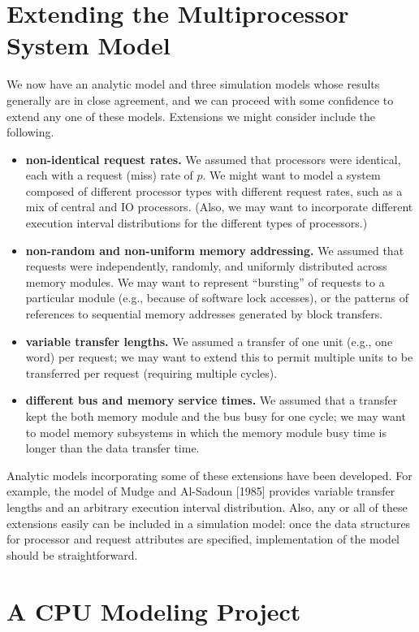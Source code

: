 \section{Extending the Multiprocessor System Model}

We now have an analytic model and three simulation models whose
results generally are in close agreement, and we can proceed with some
confidence to extend any one of these models. Extensions we might consider
include the following.
\begin{itemize}
\item \textbf{non-identical request rates.} We assumed that processors
were identical, each with a request (miss) rate of $p$. We
might want to model a system composed of different
processor types with different request rates, such as a mix of
central and IO processors. (Also, we may want to incorporate
different execution interval distributions for the different
types of processors.)
\item \textbf{non-random and non-uniform memory addressing.} We
assumed that requests were independently, randomly, and
uniformly distributed across memory modules. We may want
to represent ``bursting'' of requests to a particular module
(e.g., because of software lock accesses), or the patterns of
references to sequential memory addresses generated by block
transfers.
\item \textbf{variable transfer lengths.} We assumed a transfer of one
unit (e.g., one word) per request; we may want to extend this
to permit multiple units to be transferred per request (requiring multiple cycles).
\item \textbf{different bus and memory service times.} We assumed that
a transfer kept the both memory module and the bus busy for
one cycle; we may want to model memory subsystems in
which the memory module busy time is longer than the data
transfer time.
\end{itemize}

Analytic models incorporating some of these extensions have been developed.
For example, the model of Mudge and Al-Sadoun [1985] provides
variable transfer lengths and an arbitrary execution interval distribution.
Also, any or all of these extensions easily can be included in a simulation
model: once the data structures for processor and request attributes are
specified, implementation of the model should be straightforward.

\section{A CPU Modeling Project}

